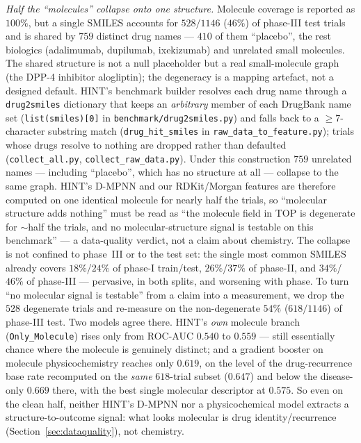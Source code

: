 \documentclass[a4paper,fleqn]{cas-sc}
\begin{document}
\emph{Half the ``molecules'' collapse onto one structure.} Molecule coverage is reported as
$100\%$, but a single SMILES accounts for $528/1146$ ($46\%$) of phase-III test trials and is
shared by $759$ distinct drug names --- $410$ of them ``placebo'', the rest biologics
(adalimumab, dupilumab, ixekizumab) and unrelated small molecules. The shared structure is not
a null placeholder but a real small-molecule graph (the DPP-4 inhibitor alogliptin); the
degeneracy is a mapping artefact, not a designed default. HINT's benchmark builder resolves
each drug name through a \texttt{drug2smiles} dictionary that keeps an \emph{arbitrary} member
of each DrugBank name set (\texttt{list(smiles)[0]} in \texttt{benchmark/drug2smiles.py}) and
falls back to a $\ge7$-character substring match (\texttt{drug\_hit\_smiles} in
\texttt{raw\_data\_to\_feature.py}); trials whose drugs resolve to nothing are dropped rather
than defaulted (\texttt{collect\_all.py}, \texttt{collect\_raw\_data.py}). Under this
construction $759$ unrelated names --- including ``placebo'', which has no structure at all ---
collapse to the same graph. HINT's D-MPNN and our RDKit/Morgan features are therefore computed
on one identical molecule for nearly half the trials, so ``molecular structure adds nothing''
must be read as ``the molecule field in TOP is degenerate for $\sim$half the trials, and no
molecular-structure signal is testable on this benchmark'' --- a data-quality verdict, not a
claim about chemistry. The collapse is not confined to phase~III or to the test set: the single
most common SMILES already covers $18\%$/$24\%$ of phase-I train/test, $26\%$/$37\%$ of phase-II,
and $34\%$/$46\%$ of phase-III --- pervasive, in both splits, and worsening with phase.
To turn ``no molecular signal is testable'' from a claim into a measurement, we drop the $528$
degenerate trials and re-measure on the non-degenerate $54\%$ ($618/1146$) of phase-III test.
Two models agree there. HINT's \emph{own} molecule branch (\texttt{Only\_Molecule}) rises only
from ROC-AUC $0.540$ to $0.559$ --- still essentially chance where the molecule is genuinely
distinct; and a gradient booster on molecule physicochemistry reaches only $0.619$, on the level of
the drug-recurrence base rate recomputed on the \emph{same} $618$-trial subset ($0.647$) and below
the disease-only $0.669$ there, with the best single molecular descriptor at $0.575$. So even on the clean half, neither HINT's
D-MPNN nor a physicochemical model extracts a structure-to-outcome signal: what looks molecular
is drug identity/recurrence (Section~\ref{sec:dataquality}), not chemistry.
\end{document}
